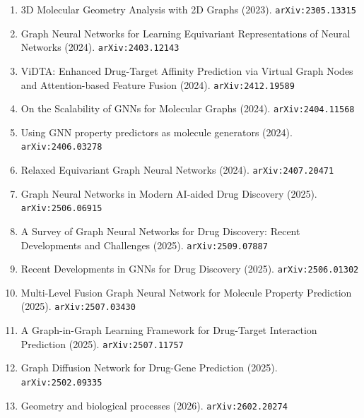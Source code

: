 \documentclass[11pt]{article}
\begin{document}
\begin{enumerate}
  \item 3D Molecular Geometry Analysis with 2D Graphs (2023). \texttt{arXiv:2305.13315}
  \item Graph Neural Networks for Learning Equivariant Representations of Neural
  Networks (2024). \texttt{arXiv:2403.12143}
  \item ViDTA: Enhanced Drug-Target Affinity Prediction via Virtual Graph Nodes
  and Attention-based Feature Fusion (2024). \texttt{arXiv:2412.19589}
  \item On the Scalability of GNNs for Molecular Graphs (2024). \texttt{arXiv:2404.11568}
  \item Using GNN property predictors as molecule generators (2024). \texttt{arXiv:2406.03278}
  \item Relaxed Equivariant Graph Neural Networks (2024). \texttt{arXiv:2407.20471}
  \item Graph Neural Networks in Modern AI-aided Drug Discovery (2025). \texttt{arXiv:2506.06915}
  \item A Survey of Graph Neural Networks for Drug Discovery: Recent Developments and Challenges (2025). \texttt{arXiv:2509.07887}
  \item Recent Developments in GNNs for Drug Discovery (2025). \texttt{arXiv:2506.01302}
  \item Multi-Level Fusion Graph Neural Network for Molecule Property Prediction (2025). \texttt{arXiv:2507.03430}
  \item A Graph-in-Graph Learning Framework for Drug-Target Interaction Prediction (2025). \texttt{arXiv:2507.11757}
  \item Graph Diffusion Network for Drug-Gene Prediction (2025). \texttt{arXiv:2502.09335}
  \item Geometry and biological processes (2026). \texttt{arXiv:2602.20274}
\end{enumerate}
\end{document}
